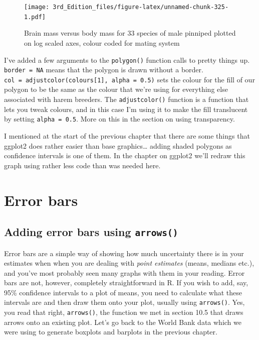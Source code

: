 \documentclass[
]{book}
\begin{document}
\begin{figure}
\centering
\texttt{[image: 3rd\_Edition\_files/figure-latex/unnamed-chunk-325-1.pdf]}
\caption{\label{fig:unnamed-chunk-325}Brain mass versus body mass for 33 species of male pinniped plotted on log scaled axes, colour coded for mating system}
\end{figure}

I've added a few arguments to the \texttt{polygon()} function calls to pretty things up. \texttt{border\ =\ NA} means that the polygon is drawn without a border. \texttt{col\ =\ adjustcolor(colours{[}1{]},\ alpha\ =\ 0.5)} sets the colour for the fill of our polygon to be the same as the colour that we're using for everything else associated with harem breeders. The \texttt{adjustcolor()} function is a function that lets you tweak colours, and in this case I'm using it to make the fill translucent by setting \texttt{alpha\ =\ 0.5}. More on this in the section on using transparency.

I mentioned at the start of the previous chapter that there are some things that ggplot2 does rather easier than base graphics\ldots{} adding shaded polygons as confidence intervals is one of them. In the chapter on ggplot2 we'll redraw this graph using rather less code than was needed here.

\hypertarget{error-bars}{%
\section{Error bars}\label{error-bars}}

\hypertarget{adding-error-bars-using-arrows}{%
\subsection{\texorpdfstring{Adding error bars using \texttt{arrows()}}{Adding error bars using arrows()}}\label{adding-error-bars-using-arrows}}

Error bars are a simple way of showing how much uncertainty there is in your estimates when when you are dealing with \emph{point estimates} (means, medians etc.), and you've most probably seen many graphs with them in your reading. Error bars are not, however, completely straightforward in R. If you wish to add, say, 95\% confidence intervals to a plot of means, you need to calculate what these intervals are and then draw them onto your plot, usually using \texttt{arrows()}. Yes, you read that right, \texttt{arrows()}, the function we met in section 10.5 that draws arrows onto an existing plot. Let's go back to the World Bank data which we were using to generate boxplots and barplots in the previous chapter.
\end{document}
